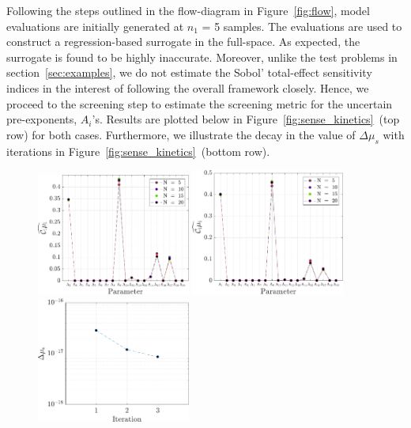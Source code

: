 Following the steps outlined in the flow-diagram in Figure~\ref{fig:flow}, model
evaluations are initially generated at $n_1$ = 5 samples. The evaluations are
used to construct a regression-based surrogate in the full-space. As
expected, the surrogate is found to be highly inaccurate. Moreover, unlike the
test problems in section~\ref{sec:examples}, we do not estimate the Sobol'
total-effect sensitivity indices in the interest of following the overall framework
closely. Hence, we proceed to the screening step to estimate the screening metric
for the uncertain pre-exponents, $A_i$'s. Results are plotted below
in Figure~\ref{fig:sense_kinetics}~(top row) for both cases. Furthermore, we illustrate
the decay in the value of $\Delta\mu_s$ with iterations in 
Figure~\ref{fig:sense_kinetics}~(bottom row). 

\begin{figure}[htbp]
 \begin{center}
  \includegraphics[width=0.45\textwidth]{./Figures/ub_conv_kinetics_rich}
  \includegraphics[width=0.45\textwidth]{./Figures/ub_conv_kinetics_lean}
  \\ \vspace{2mm}
  \includegraphics[width=0.45\textwidth]{./Figures/mu_rich}

\end{center}
\end{figure}
